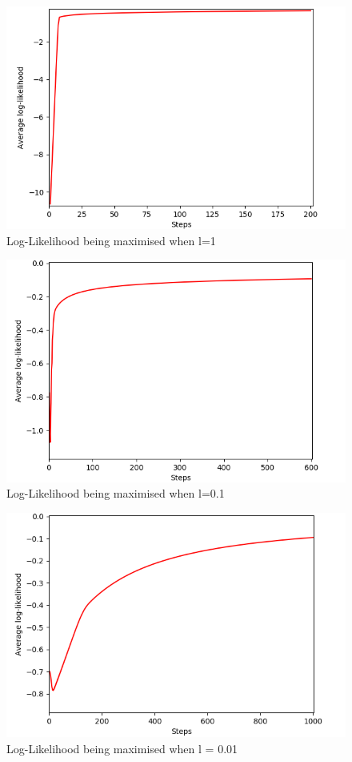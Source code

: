 \documentclass[twoside,twocolumn]{article}
\begin{document}
\begin{figure}[h]
  \centering
    \includegraphics[width=\linewidth]{l=1log}
  \caption{Log-Likelihood being maximised when l=1}
  \label{fig:T2}
\end{figure}
\begin{figure}[h]
  \centering
    \includegraphics[width=\linewidth]{l=0-1log}
  \caption{Log-Likelihood being maximised when l=0.1}
  \label{fig:T3}
\end{figure}
\begin{figure}[h]
  \centering
    \includegraphics[width=\linewidth]{l=0-01log}
  \caption{Log-Likelihood being maximised when l = 0.01}
  \label{fig:T4}
\end{figure}
\end{document}
